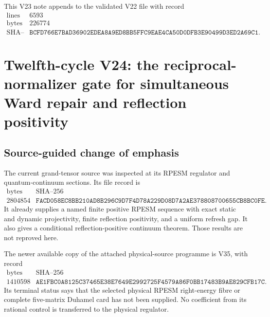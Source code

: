 \documentclass[11pt]{article}
\theoremstyle{remark}
\begin{document}
This V23 note appends to the validated V22 file with record
\[
\begin{array}{c|c}
\text{lines}&6593\\
\text{bytes}&226774\\
\text{SHA--256}&
\texttt{BCFD766E7BAD36902EDEA8A9ED8BB5FFC9EAE4CA50D0DFB3E90499D3ED2A69C1}.
\end{array}
\]


\section{Twelfth-cycle V24: the reciprocal-normalizer gate for
simultaneous Ward repair and reflection positivity}
\label{sec:v12v24}

\subsection{Source-guided change of emphasis}

The current grand-tensor source was inspected at its RPESM regulator
and quantum-continuum sections.  Its file record is
\[
\begin{array}{c|r|c}
\text{bytes}&\text{SHA--256}\\ \hline
2804854&
\texttt{FACD058EC8BB210AD8B296C9D7F4D78A229D08D7A2AE378808700655CB8BC0FE}.
\end{array}                                                   \tag{24.1}
\]
It already supplies a named finite positive RPESM sequence with exact
static and dynamic projectivity, finite reflection positivity, and a
uniform refresh gap.  It also gives a conditional
reflection-positive continuum theorem.  Those results are not
reproved here.

The newer available copy of the attached physical-source programme
is V35, with record
\[
\begin{array}{c|r|c}
\text{bytes}&\text{SHA--256}\\ \hline
1410598&
\texttt{AE1FBC0A8125C37465E38E7649E2992725F4579A86F0BB17483B9AE829CFB17C}.
\end{array}                                                   \tag{24.2}
\]
Its terminal status says that the selected physical RPESM
right-energy fibre or complete five-matrix Duhamel card has not been
supplied.  No coefficient from its rational control is transferred
to the physical regulator.
\end{document}
